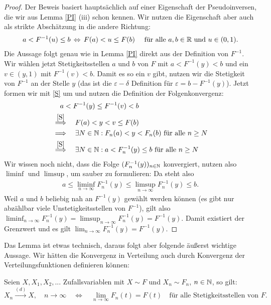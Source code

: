 \begin{proof}
	Der Beweis basiert haupts\"achlich auf einer Eigenschaft der Pseudoinversen, die wir aus Lemma \ref{PI} (iii) schon kennen. Wir nutzen die Eigenschaft aber auch als strikte Absch\"atzung in die andere Richtung:
	\begin{align}\label{S}
		a<F^{-1}(u)\leq b  \, \Leftrightarrow \,  F(a)<u\leq F(b)\quad \text{ f\"ur alle }a,b \in \mathbb{R}\text{ und }u \in (0,1).
	\end{align}
	Die Aussage folgt genau wie in Lemma \ref{PI} direkt aus der Definition von $F^{-1}$. Wir w\"ahlen jetzt Stetigkeitsstellen $a$ und $b$ von $F$ mit $a<F^{-1}(y)<b$ und ein $v\in (y,1)$ mit $F^{-1}(v)<b$. Damit es so ein $v$ gibt, nutzen wir die Stetigkeit von $F^{-1}$ an der Stelle $y$ (das ist die $\varepsilon-\delta$ Definition f\"ur $\varepsilon=b-F^{-1}(y)$). Jetzt formen wir mit \eqref{S} um und nutzen die Definition der Folgenkonvergenz:
	\begin{align*}
		&\quad a<F^{-1}(y)\leq F^{-1}(v)<b\\
		&\overset{\eqref{S}}{\Longrightarrow} \quad F(a)<y<v\leq F(b)\\
		&\Longrightarrow \quad \exists N\in\mathbb{N}: F_n(a)<y<F_n(b)\text{ f\"ur alle }n\geq N\\
		&\overset{\eqref{S}}{\Longrightarrow} \quad \exists N\in\mathbb{N}: a<F_n^{-1}(y)\leq b\text{ f\"ur alle }n\geq N
	\end{align*}
	Wir wissen noch nicht, dass die Folge $(F_n^{-1}(y))_{n\in\mathbb{N}}$ konvergiert, nutzen also $\liminf$ und $\limsup$, um sauber zu formulieren: Da steht also 
	\begin{align*}
		a\leq \liminf_{n\to\infty} F_n^{-1}(y) \leq \limsup_{n\to\infty} F_n^{-1}(y)\leq b.
	\end{align*}
	Weil $a$ und $b$ beliebig nah an $F^{-1}(y)$ gew\"ahlt werden k\"onnen (es gibt nur abz\"ahlbar viele Unstetigkeitsstellen von $F^{-1}$), gilt also $ \liminf_{n\to\infty} F_n^{-1}(y) = \limsup_{n\to\infty} F_n^{-1}(y) =F^{-1}(y)$. Damit existiert der Grenzwert und es gilt $\lim_{n\to\infty} F^{-1}_n(y)=F^{-1}(y)$.
	\end{proof}
Das Lemma ist etwas technisch, daraus folgt aber folgende \"au\ss erst wichtige Aussage. Wir h\"atten die Konvergenz in Verteilung auch durch Konvergenz der Verteilungsfunktionen definieren k\"onnen:
\begin{satz}\label{459}
	Seien $X, X_1,X_2,...$ Zufallsvariablen mit $X\sim F$ und $X_n\sim F_n$, $n\in\mathbb{N}$, so  gilt:
	\[ X_n \overset{{(d)}}{\longrightarrow} X, \quad n \to \infty \quad \Longleftrightarrow\quad \lim_{n\to\infty} F_n(t) =F(t)\quad \text{f\"ur alle Stetigkeitsstellen von }F. \]
\end{satz}

